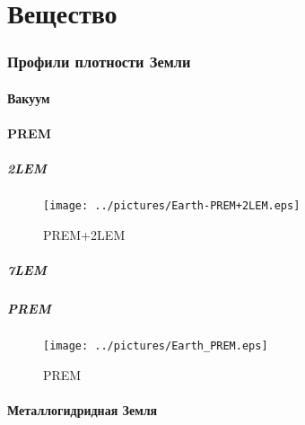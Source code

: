 \part{Вещество}
\section{Профили плотности Земли}
\subsection{Вакуум}
\subsection{PREM}
\subsubsection{2LEM}
\begin{figure}[!ht]
\begin{center}
\texttt{[image: ../pictures/Earth-PREM+2LEM.eps]}
\end{center}
\caption{PREM+2LEM}
\label{PREM+2LEM}
\end{figure}
\subsubsection{7LEM}
\subsubsection{PREM}
\begin{figure}[!ht]
\begin{center}
\texttt{[image: ../pictures/Earth\_PREM.eps]}
\end{center}
\caption{PREM}
\label{PREM}
\end{figure}
\subsection{Металлогидридная Земля}
